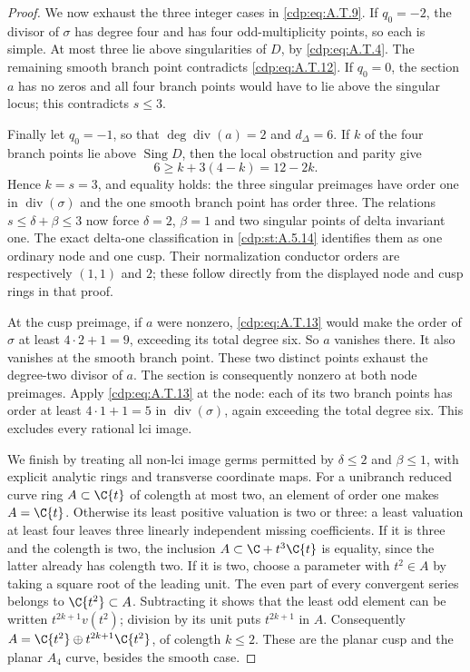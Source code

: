 \begin{proof}
We now exhaust the three integer cases in \eqref{cdp:eq:A.T.9}.
If $q_0=-2$, the divisor of $\sigma$ has degree four
and has four odd-multiplicity points, so each is
simple. At most three lie above singularities of
$D$, by \eqref{cdp:eq:A.T.4}. The remaining smooth branch point
contradicts \eqref{cdp:eq:A.T.12}.
If $q_0=0$, the section $a$ has no zeros and all
four branch points would have to lie above the
singular locus; this contradicts $s\le3$.

Finally let $q_0=-1$, so that $\deg\operatorname{div}(a)=2$
and $d_\Delta=6$. If $k$ of the four branch points
lie above $\operatorname{Sing}D$, then the local
obstruction and parity give
\[
               6\ge k+3(4-k)=12-2k.
\]
Hence $k=s=3$, and equality holds: the three singular
preimages have order one in $\operatorname{div}(\sigma)$
and the one smooth branch point has order three.
The relations $s\le\delta+\beta\le3$ now force
$\delta=2$, $\beta=1$ and two singular points of
delta invariant one. The exact delta-one
classification in \ref{cdp:st:A.5.14} identifies them as one
ordinary node and one cusp. Their normalization
conductor orders are respectively $(1,1)$ and $2$;
these follow directly from the displayed node and
cusp rings in that proof.

At the cusp preimage, if $a$ were nonzero,
\eqref{cdp:eq:A.T.13} would make the order of $\sigma$ at least
$4\cdot2+1=9$, exceeding its total degree six.
So $a$ vanishes there. It also vanishes at the
smooth branch point. These two distinct points
exhaust the degree-two divisor of $a$. The section
is consequently nonzero at both node preimages.
Apply \eqref{cdp:eq:A.T.13} at the node: each of its two branch
points has order at least $4\cdot1+1=5$ in
$\operatorname{div}(\sigma)$, again exceeding the
total degree six. This excludes every rational lci image.

We finish by treating all non-lci image germs permitted
by $\delta\le2$ and $\beta\le1$, with explicit analytic
rings and transverse coordinate maps. For a unibranch
reduced curve ring $A\subset\C\{t\}$ of colength at
most two, an element of order one makes $A=\C\{t\}$.
Otherwise its least positive valuation is two or three:
a least valuation at least four leaves three linearly
independent missing coefficients. If it is three and
the colength is two, the inclusion
$A\subset\C+t^3\C\{t\}$ is equality, since the latter
already has colength two. If it is two, choose a
parameter with $t^2\in A$ by taking a square root of
the leading unit. The even part of every convergent
series belongs to $\C\{t^2\}\subset A$. Subtracting
it shows that the least odd element can be written
$t^{2k+1}v(t^2)$; division by its unit puts
$t^{2k+1}$ in $A$. Consequently
$A=\C\{t^2\}\oplus t^{2k+1}\C\{t^2\}$, of colength
$k\le2$. These are the planar cusp and the planar
$A_4$ curve, besides the smooth case.


\end{proof}
